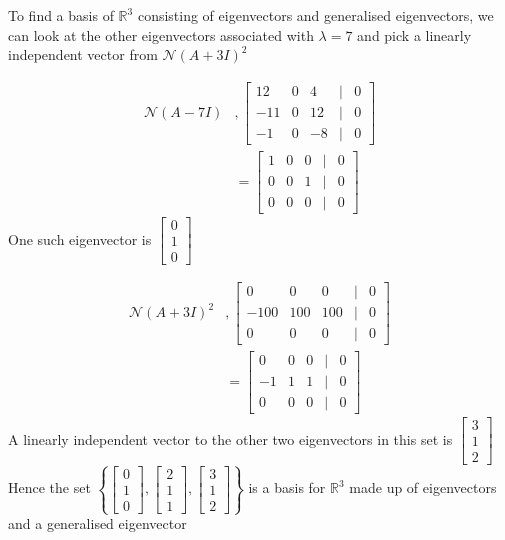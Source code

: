 \documentclass{article}
\begin{document}
To find a basis of \(\mathbb{R}^3\) consisting of eigenvectors and generalised eigenvectors, we can look at the other eigenvectors 
associated with \(\lambda = 7\) and pick a linearly independent vector from \(\mathcal{N}(A+3I)^2\)

\begin{align*}
    \mathcal{N}(A-7I) &, \begin{bmatrix}
        12 & 0 & 4 &| & 0 \\
        -11 & 0 & 12 &|& 0 \\
        -1 & 0 & -8& |&  0
    \end{bmatrix}
    \\
    &= \begin{bmatrix}
        1 & 0 & 0 &| & 0 \\
        0 & 0 & 1 &|& 0 \\
        0 & 0 & 0& |&  0
    \end{bmatrix}
\end{align*}
One such eigenvector is \(\begin{bmatrix}
    0 \\ 1 \\0
\end{bmatrix}\)

\begin{align*}
    \mathcal{N}(A+3I)^2 &, \begin{bmatrix}
        0 & 0 & 0 &| & 0 \\
        -100 & 100 & 100 &|& 0 \\
        0 & 0 & 0& |&  0
    \end{bmatrix}
    \\
    &= \begin{bmatrix}
        0 & 0 & 0 &| & 0 \\
        -1 & 1 & 1 &|& 0 \\
        0 & 0 & 0& |&  0
    \end{bmatrix}
\end{align*}
A linearly independent vector to the other two eigenvectors in this set is \(\begin{bmatrix}
    3 \\ 1 \\ 2
\end{bmatrix}\)
\\

Hence the set \(\left\{\begin{bmatrix}
0 \\ 1 \\ 0
\end{bmatrix}, \begin{bmatrix}
2 \\ 1 \\1
\end{bmatrix}, \begin{bmatrix}
3 \\ 1 \\ 2
\end{bmatrix}\right\}\) is a basis for \(\mathbb{R}^3\) made up of eigenvectors and a generalised eigenvector
\end{document}
